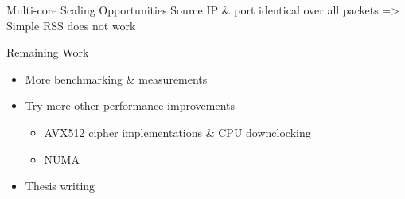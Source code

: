 \documentclass[NET,english]{tumbeamer}
\begin{document}
\begin{frame}{Multi-core Scaling Opportunities}
	Source IP \& port identical over all packets => Simple RSS does not work
	
	
\end{frame}

\begin{frame}{Remaining Work}
	\begin{itemize}
		\item More benchmarking \& measurements
		\item Try more other performance improvements
		\begin{itemize}
			\item AVX512 cipher implementations \& CPU downclocking
			\item NUMA
		\end{itemize}
		\item Thesis writing
	\end{itemize}
\end{frame}

%    
%    
\end{document}
